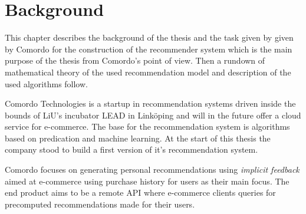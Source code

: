 
\chapter{Background}\label{cha:background}
\vspace{-0.5cm} %

This chapter describes the background of the thesis and the task given by given by Comordo for the construction of the recommender system which is the main purpose of the thesis from Comordo's point of view. Then a rundown of mathematical theory of the used recommendation model and description of the used algorithms follow.


Comordo Technologies is a startup in recommendation systems driven inside the bounds of LiU's incubator LEAD in Linköping and will in the future offer a cloud service for e-commerce. The base for the recommendation system is algorithms based on predication and machine learning. At the start of this thesis the company stood to build a first version of it's recommendation system.

Comordo focuses on generating personal recommendations using \textit{implicit feedback} aimed at e-commerce using purchase history for users as their main focus. The end product aims to be a remote API where e-commerce clients queries for precomputed recommendations made for their users.






